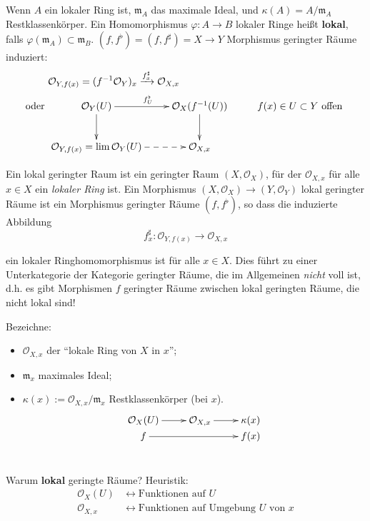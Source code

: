 \begin{notation*}
  Wenn $A$ ein lokaler Ring ist, $\mathfrak{m}_{A}$ das maximale Ideal,
  und $\kappa(A)=A/\mathfrak{m}_{A}$ Restklassenkörper. Ein Homomorphismus
  $\varphi:A\rightarrow B$ lokaler Ringe heißt \textbf{lokal}, falls
  $\varphi(\mathfrak{m}_{A})\subset\mathfrak{m}_{B}$. $(f,f^{\flat})=(f,f^{\sharp})=X\rightarrow Y$
  Morphismus geringter Räume induziert:
  \begin{align*}
    & \mathcal{O}_{Y,f(x)}=(f^{-1}\mathcal{O}_{Y})_{x}\xrightarrow{f_{x}^{\sharp}}\mathcal{O}_{X,x}\\
    \text{oder } & \xymatrix{\mathcal{O}_{Y}(U)\ar[r]^{f_{U}^{\flat}}\ar[d] & \mathcal{O}_{X}(f^{-1}(U))\ar[d] & f(x)\in U\subset Y\text{ offen}\\
      \mathcal{O}_{Y,f(x)}=\lim\mathcal{O}_{Y}(U)\ar@{-->}[r] & \mathcal{O}_{X,x}
    }
  \end{align*}
\end{notation*}
\begin{defn}[orig. 31]
  Ein lokal geringter Raum ist ein geringter Raum $(X,\mathcal{O}_{X})$,
  für der $\mathcal{O}_{X,x}$ für alle $x\in X$ ein \emph{lokaler
    Ring} ist. Ein Morphismus $(X,\mathcal{O}_{X})\rightarrow(Y,\mathcal{O}_{Y})$
  lokal geringter Räume ist ein Morphismus geringter Räume $(f,f^{\flat})$,
  so dass die induzierte Abbildung 
  \[
  f_{x}^{\sharp}:\mathcal{O}_{Y,f(x)}\rightarrow\mathcal{O}_{X,x}
  \]

  ein lokaler Ringhomomorphismus ist für alle $x\in X$. Dies führt
  zu einer Unterkategorie der Kategorie geringter Räume, die im Allgemeinen
  \emph{nicht }voll ist, d.h. es gibt Morphismen $f$ geringter Räume
  zwischen lokal geringten Räume, die nicht lokal sind!
\end{defn}

Bezeichne: 
\begin{itemize}
\item $\mathcal{O}_{X,x}$ der ``lokale Ring von $X$ in $x$'';
\item $\mathfrak{m}_{x}$ maximales Ideal;
\item $\kappa(x):=\mathcal{O}_{X,x}/\mathfrak{m}_{x}$ Restklassenkörper
  (bei $x$). \texttt{
  \[
  \xymatrix@R=0pt{\mathcal{O}_{X}(U)\ar[r] & \mathcal{O}_{X,x}\ar[r] & \kappa(x)\\
    f\ar[rr] &  & f(x)
  }
  \]
}
\end{itemize}
Warum \textbf{lokal} geringte Räume? Heuristik:
\begin{align*}
  \mathcal{O}_{X}(U) & \leftrightarrow\text{Funktionen auf }U\\
  \mathcal{O}_{X,x} & \leftrightarrow\text{Funktionen auf Umgebung }U\text{ von }x
\end{align*}

